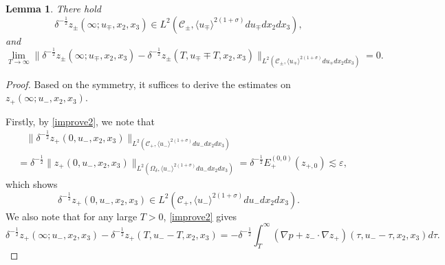 \documentclass[10pt,reqno]{amsart}
\numberwithin{equation}{section}
\newtheorem{lemma}[theorem]{Lemma}
\begin{document}
\begin{lemma}\label{lemma4}
There hold
	\begin{equation}\label{eq1}
		 \delta^{-\frac{1}{2}}z_{\pm}(\infty;u_\mp,x_2,x_3)\in L^2(\mathcal{C}_\pm,\langle u_\mp\rangle^{2(1+\sigma)}du_\mp dx_2dx_3),
	\end{equation}
and 
\begin{equation}\label{eq2}
\lim_{T\to\infty}\Big\|\delta^{-\frac{1}{2}}z_{\pm}(\infty;u_\mp,x_2,x_3)-\delta^{-\frac{1}{2}}z_{\pm}(T,u_\mp\mp T,x_2,x_3)\Big\|_{L^2(\mathcal{C}_\pm,\langle u_\mp\rangle^{2(1+\sigma)}du_\mp dx_2dx_3)}=0.
\end{equation}
\end{lemma}
\begin{proof}
	Based on the symmetry, it suffices to derive the estimates on $z_{+}(\infty;u_-,x_2,x_3)$.
	
Firstly, by \eqref{improve2}, we note that 
\begin{align*}
	&\ \ \ \ \big\|\delta^{-\frac{1}{2}}z_+(0,u_-,x_2,x_3)\big\|_{L^2(\mathcal{C}_+,\langle u_-\rangle^{2(1+\sigma)}du_-dx_2dx_3)}\\
	&	= \delta^{-\frac{1}{2}}\big\|z_+(0,u_-,x_2,x_3)\big\|_{L^2(\Omega_\delta,\langle u_-\rangle^{2(1+\sigma)}du_-dx_2dx_3)}
	=\delta^{-\frac{1}{2}}E_+^{(0,0)}(z_{+,0})
	\lesssim  \varepsilon,
\end{align*}
which shows 
\begin{equation}\label{eq:lemma1-14}  \delta^{-\frac{1}{2}}z_{+}(0,u_-,x_2,x_3)\in L^2(\mathcal{C}_+,\langle u_-\rangle^{2(1+\sigma)}du_-dx_2dx_3).
\end{equation}
We also note that for any large $T>0$, \eqref{improve2} gives
\begin{equation}\label{eq:def-large}
	\delta^{-\frac{1}{2}}z_{+}(\infty;u_-,x_2,x_3)-\delta^{-\frac{1}{2}}z_{+}(T,u_--T,x_2,x_3)=-\delta^{-\frac{1}{2}}\int_T^{\infty}(\nabla p+z_{-}\cdot\nabla z_{+})(\tau,u_--\tau,x_2,x_3)d\tau.
\end{equation}


\end{proof}
\end{document}
